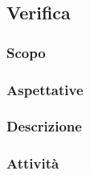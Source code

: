 \subsection{Verifica}

	\subsubsection{Scopo}
	\subsubsection{Aspettative}
	\subsubsection{Descrizione}
	\subsubsection{Attività}
